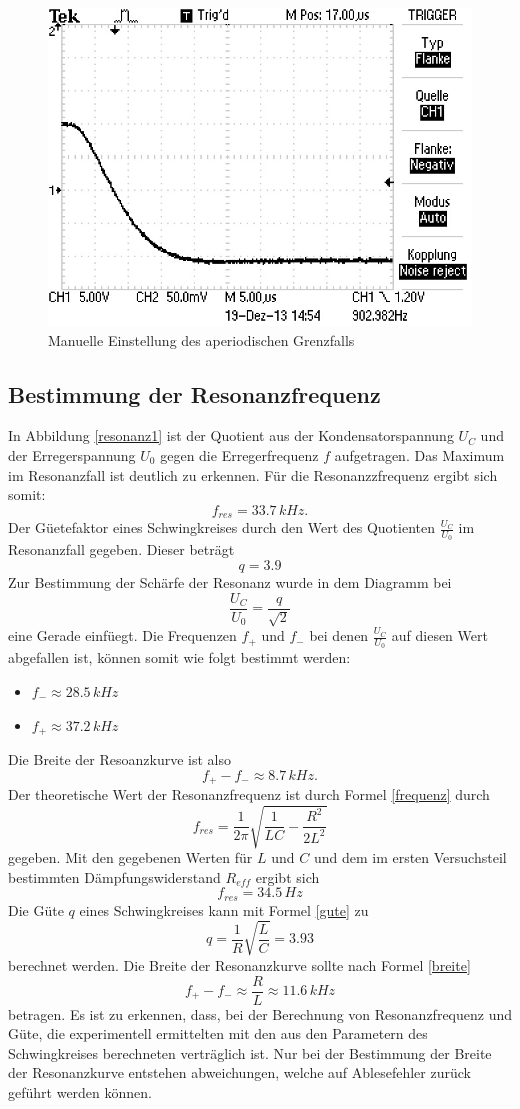 \documentclass[11pt,ngerman,a4paper]{article}
\begin{document}
\begin{figure}[h!]
\centering
\includegraphics[scale=0.5]{apgrenzfall.png}
\caption{Manuelle Einstellung des aperiodischen Grenzfalls}
\label{apgrenzfall}
\end{figure}
\subsection{Bestimmung der Resonanzfrequenz}
In Abbildung \ref{resonanz1} ist der Quotient aus der Kondensatorspannung $U_C$ und der Erregerspannung $U_0$ gegen die Erregerfrequenz $f$ aufgetragen. Das Maximum im Resonanzfall ist deutlich zu erkennen. F\"ur die Resonanzzfrequenz ergibt sich somit:
\[
	f_{res} = 33.7\,kHz.
\]
Der G\"uetefaktor eines Schwingkreises durch den Wert des Quotienten $\frac{U_C}{U_0}$ im Resonanzfall gegeben. Dieser betr\"agt
\[
q =  3.9
\]
Zur Bestimmung der Sch\"arfe der Resonanz wurde in dem Diagramm bei 
\[
\frac{U_C}{U_0} = \frac{q}{\sqrt{2}}
\]
eine Gerade einf\"uegt. Die Frequenzen $f_+$ und $f_-$ bei denen $\frac{U_C}{U_0}$ auf diesen Wert abgefallen ist, k\"onnen somit wie folgt bestimmt werden:
\begin{itemize}
\item $f_- \approx 28.5\,kHz$
\item $f_+ \approx 37.2\,kHz$
\end{itemize}
Die Breite der Resoanzkurve ist also
\[
f_+ - f_- \approx 8.7\,kHz. 
\]
\noindent
Der theoretische Wert der Resonanzfrequenz ist durch Formel \ref{frequenz} durch
\[
f_{res} = \frac1{2\pi} \sqrt{\frac{1}{LC}-\frac{R^2}{2L^2}}
\]
gegeben. Mit den gegebenen Werten f\"ur $L$ und $C$ und dem im ersten Versuchsteil bestimmten D\"ampfungswiderstand
$R_{eff}$ ergibt sich 
\[
f_{res} = 34.5\,Hz
\]
Die G\"ute $q$ eines Schwingkreises kann mit Formel \ref{gute} zu
\[
q = \frac{1}{R} \sqrt{\frac{L}{C}} = 3.93
\]
berechnet werden. Die Breite der Resonanzkurve sollte nach Formel \ref{breite}
\[
f_+ - f_- \approx \frac{R}{L} \approx 11.6\,kHz
\]
betragen. Es ist zu erkennen, dass, bei der Berechnung von Resonanzfrequenz und G\"ute, die experimentell ermittelten mit den aus den Parametern des Schwingkreises berechneten vertr\"aglich ist. Nur bei der Bestimmung der Breite der Resonanzkurve entstehen abweichungen, welche auf Ablesefehler zur\"uck gef\"uhrt werden k\"onnen. 
\end{document}
